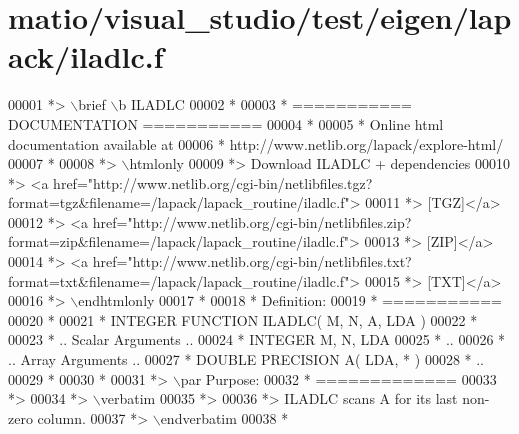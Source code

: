\hypertarget{matio_2visual__studio_2test_2eigen_2lapack_2iladlc_8f_source}{}\section{matio/visual\+\_\+studio/test/eigen/lapack/iladlc.f}
\label{matio_2visual__studio_2test_2eigen_2lapack_2iladlc_8f_source}

\begin{DoxyCode}
00001 \textcolor{comment}{*> \(\backslash\)brief \(\backslash\)b ILADLC}
00002 \textcolor{comment}{*}
00003 \textcolor{comment}{*  =========== DOCUMENTATION ===========}
00004 \textcolor{comment}{*}
00005 \textcolor{comment}{* Online html documentation available at }
00006 \textcolor{comment}{*            http://www.netlib.org/lapack/explore-html/ }
00007 \textcolor{comment}{*}
00008 \textcolor{comment}{*> \(\backslash\)htmlonly}
00009 \textcolor{comment}{*> Download ILADLC + dependencies }
00010 \textcolor{comment}{*> <a
       href="http://www.netlib.org/cgi-bin/netlibfiles.tgz?format=tgz&filename=/lapack/lapack\_routine/iladlc.f"> }
00011 \textcolor{comment}{*> [TGZ]</a> }
00012 \textcolor{comment}{*> <a
       href="http://www.netlib.org/cgi-bin/netlibfiles.zip?format=zip&filename=/lapack/lapack\_routine/iladlc.f"> }
00013 \textcolor{comment}{*> [ZIP]</a> }
00014 \textcolor{comment}{*> <a
       href="http://www.netlib.org/cgi-bin/netlibfiles.txt?format=txt&filename=/lapack/lapack\_routine/iladlc.f"> }
00015 \textcolor{comment}{*> [TXT]</a>}
00016 \textcolor{comment}{*> \(\backslash\)endhtmlonly }
00017 \textcolor{comment}{*}
00018 \textcolor{comment}{*  Definition:}
00019 \textcolor{comment}{*  ===========}
00020 \textcolor{comment}{*}
00021 \textcolor{comment}{*       INTEGER FUNCTION ILADLC( M, N, A, LDA )}
00022 \textcolor{comment}{* }
00023 \textcolor{comment}{*       .. Scalar Arguments ..}
00024 \textcolor{comment}{*       INTEGER            M, N, LDA}
00025 \textcolor{comment}{*       ..}
00026 \textcolor{comment}{*       .. Array Arguments ..}
00027 \textcolor{comment}{*       DOUBLE PRECISION   A( LDA, * )}
00028 \textcolor{comment}{*       ..}
00029 \textcolor{comment}{*  }
00030 \textcolor{comment}{*}
00031 \textcolor{comment}{*> \(\backslash\)par Purpose:}
00032 \textcolor{comment}{*  =============}
00033 \textcolor{comment}{*>}
00034 \textcolor{comment}{*> \(\backslash\)verbatim}
00035 \textcolor{comment}{*>}
00036 \textcolor{comment}{*> ILADLC scans A for its last non-zero column.}
00037 \textcolor{comment}{*> \(\backslash\)endverbatim}
00038 \textcolor{comment}{*}

\end{DoxyCode}
